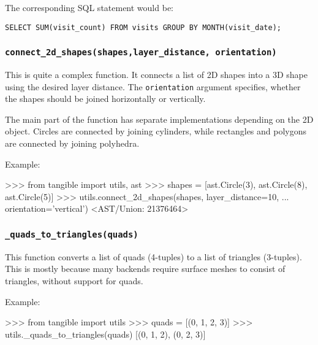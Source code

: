 \noindent The corresponding SQL statement would be:

\vspace{.5\baselineskip}
\begin{verbatim}
SELECT SUM(visit_count) FROM visits GROUP BY MONTH(visit_date);
\end{verbatim}




\subsubsection{\texttt{connect\_2d\_shapes(shapes,layer\_distance, orientation)}}

This is quite a complex function. It connects a list of 2D shapes into a 3D
shape using the desired layer distance. The \texttt{orientation} argument
specifies, whether the shapes should be joined horizontally or vertically.

\noindent The main part of the function has separate implementations depending
on the 2D object. Circles are connected by joining cylinders, while rectangles
and polygons are connected by joining polyhedra.

\vspace{.5\baselineskip}

\noindent Example:

\vspace{.5\baselineskip}
\begin{pythoncode}
>>> from tangible import utils, ast
>>> shapes = [ast.Circle(3), ast.Circle(8), ast.Circle(5)]
>>> utils.connect_2d_shapes(shapes, layer_distance=10,
...     orientation='vertical')
<AST/Union: 21376464>
\end{pythoncode}


\subsubsection{\texttt{\_quads\_to\_triangles(quads)}}

This function converts a list of quads (4-tuples) to a list of triangles
(3-tuples). This is mostly because many backends require surface meshes to
consist of triangles, without support for quads.

\vspace{.5\baselineskip}

\noindent Example:

\vspace{.5\baselineskip}
\begin{pythoncode}
>>> from tangible import utils
>>> quads = [(0, 1, 2, 3)]
>>> utils._quads_to_triangles(quads)
[(0, 1, 2), (0, 2, 3)]
\end{pythoncode}

